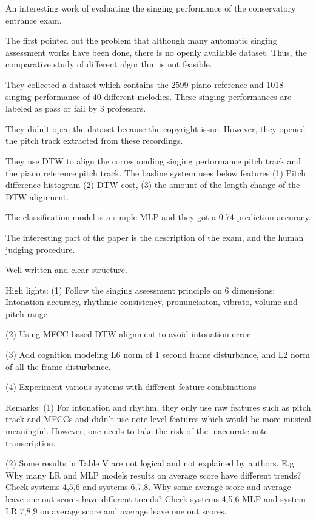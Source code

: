  An interesting work of evaluating the singing performance of the conservatory entrance exam.

The first pointed out the problem that although many automatic singing assessment works have been done, there is no openly available dataset. Thus, the comparative study of different algorithm is not feasible.

They collected a dataset which contains the 2599 piano reference and 1018 singing performance of 40 different melodies. These singing performances are labeled as pass or fail by 3 professors.

They didn't open the dataset because the copyright issue. However, they opened the pitch track extracted from these recordings.

They use DTW to align the corresponding singing performance pitch track and the piano reference pitch track. The basline system uses below features (1) Pitch difference histogram (2) DTW cost, (3) the amount of the length change of the DTW alignment.

The classification model is a simple MLP and they got a 0.74 prediction accuracy.

The interesting part of the paper is the description of the exam, and the human judging procedure.

 Well-written and clear structure.

High lights:
(1) Follow the singing assessment principle on 6 dimensions:
Intonation accuracy, rhythmic consistency, pronunciaiton, vibrato, volume and pitch range

(2) Using MFCC based DTW alignment to avoid intonation error

(3) Add cognition modeling L6 norm of 1 second frame disturbance, and L2 norm of all the frame disturbance. 

(4) Experiment various systems with different feature combinations

Remarks:
(1) For intonation and rhythm, they only use raw features such as pitch track and MFCCs and didn't use note-level features which would be more musical meaningful. However, one needs to take the risk of the inaccurate note transcription.

(2) Some results in Table V are not logical and not explained by authors. E.g. Why many LR and MLP models results on average score have different trends? Check systems 4,5,6 and systems 6,7,8. Why some average score and average leave one out scores have different trends? Check systems 4,5,6 MLP and system LR 7,8,9 on average score and average leave one out scores.

